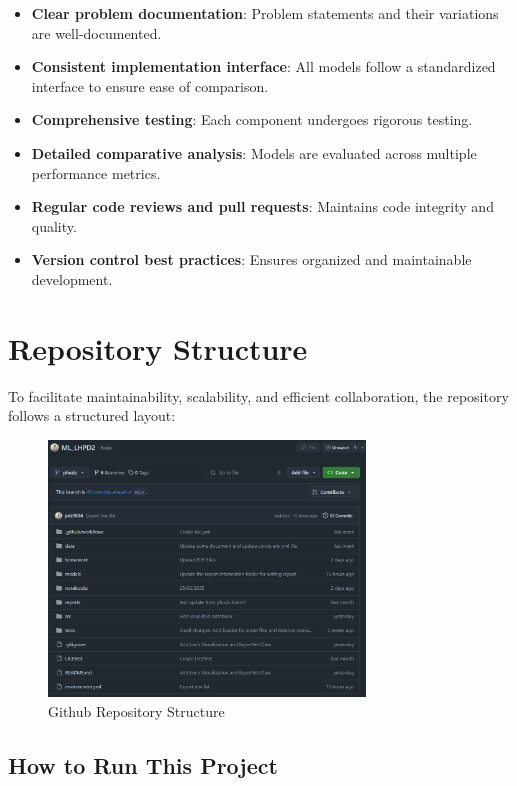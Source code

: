 \begin{itemize}
    \item \textbf{Clear problem documentation}: Problem statements and their variations are well-documented.
    \item \textbf{Consistent implementation interface}: All models follow a standardized interface to ensure ease of comparison.
    \item \textbf{Comprehensive testing}: Each component undergoes rigorous testing.
    \item \textbf{Detailed comparative analysis}: Models are evaluated across multiple performance metrics.
    \item \textbf{Regular code reviews and pull requests}: Maintains code integrity and quality.
    \item \textbf{Version control best practices}: Ensures organized and maintainable development.
\end{itemize}

\section{Repository Structure}

To facilitate maintainability, scalability, and efficient collaboration, the repository follows a structured layout:

\begin{figure}[H]
    \centering
    \includegraphics[width=0.75\textwidth]{img/progress/github_repo.PNG}
    \caption{Github Repository Structure}
    \label{fig:github-repo}
\end{figure}

\subsection{How to Run This Project}

